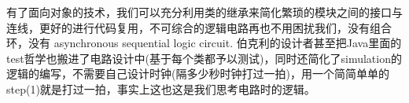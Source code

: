 \documentclass[11pt]{article}
\begin{document}
有了面向对象的技术，我们可以充分利用类的继承来简化繁琐的模块之间的接口与连线，更好的进行代码复用，不可综合的逻辑电路再也不用困扰我们，没有组合环，没有 asynchronous sequential logic circuit. 伯克利的设计者甚至把Java里面的test哲学也搬进了电路设计中(基于每个类都予以测试)，同时还简化了simulation的逻辑的编写，不需要自己设计时钟(隔多少秒时钟打过一拍)，用一个简简单单的step(1)就是打过一拍，事实上这也这是我们思考电路时的逻辑。
\def\St{\State}
\DeclarePairedDelimiter\ceil{\lceil}{\rceil}
\DeclarePairedDelimiter\floor{\lfloor}{\rfloor}
\end{document}
